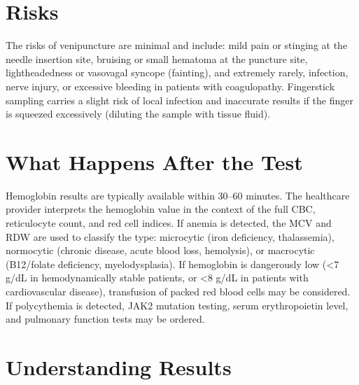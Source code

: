\section*{Risks}
The risks of venipuncture are minimal and include: mild pain or stinging at the needle insertion site, bruising or small hematoma at the puncture site, lightheadedness or vasovagal syncope (fainting), and extremely rarely, infection, nerve injury, or excessive bleeding in patients with coagulopathy. Fingerstick sampling carries a slight risk of local infection and inaccurate results if the finger is squeezed excessively (diluting the sample with tissue fluid).

\section*{What Happens After the Test}
Hemoglobin results are typically available within 30--60 minutes. The healthcare provider interprets the hemoglobin value in the context of the full CBC, reticulocyte count, and red cell indices. If anemia is detected, the MCV and RDW are used to classify the type: microcytic (iron deficiency, thalassemia), normocytic (chronic disease, acute blood loss, hemolysis), or macrocytic (B12/folate deficiency, myelodysplasia). If hemoglobin is dangerously low (<7 g/dL in hemodynamically stable patients, or <8 g/dL in patients with cardiovascular disease), transfusion of packed red blood cells may be considered. If polycythemia is detected, JAK2 mutation testing, serum erythropoietin level, and pulmonary function tests may be ordered.

\section*{Understanding Results}

